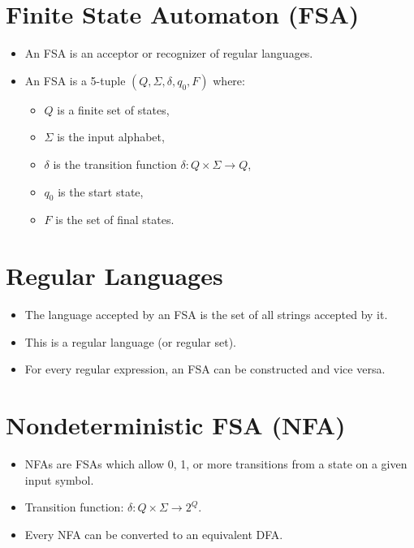 \documentclass[12pt,a4paper]{article}
\begin{document}
\section{Finite State Automaton (FSA)}
\begin{itemize}
    \item An FSA is an acceptor or recognizer of regular languages.
    \item An FSA is a 5-tuple $(Q, \Sigma, \delta, q_0, F)$ where:
    \begin{itemize}
        \item $Q$ is a finite set of states,
        \item $\Sigma$ is the input alphabet,
        \item $\delta$ is the transition function $\delta : Q \times \Sigma \to Q$,
        \item $q_0$ is the start state,
        \item $F$ is the set of final states.
    \end{itemize}
\end{itemize}

\section{Regular Languages}
\begin{itemize}
    \item The language accepted by an FSA is the set of all strings accepted by it.
    \item This is a regular language (or regular set).
    \item For every regular expression, an FSA can be constructed and vice versa.
\end{itemize}

\section{Nondeterministic FSA (NFA)}
\begin{itemize}
    \item NFAs are FSAs which allow 0, 1, or more transitions from a state on a given input symbol.
    \item Transition function: $\delta : Q \times \Sigma \to 2^Q$.
    \item Every NFA can be converted to an equivalent DFA.
\end{itemize}
\end{document}
